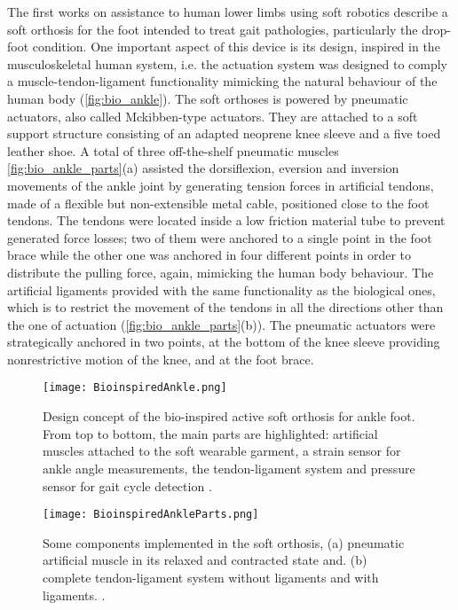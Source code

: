 The first works on assistance to human lower limbs using soft robotics \cite{park2011bio,Hamedi2015} describe a soft orthosis for the foot intended to treat gait pathologies, particularly the drop-foot condition. One important aspect of this device is its design, inspired in the musculoskeletal human system, i.e. the actuation system was designed to comply a muscle-tendon-ligament functionality mimicking the natural behaviour of the human body (\autoref{fig:bio_ankle}). The soft orthoses is powered by pneumatic actuators, also called Mckibben-type actuators. They are attached to a soft support structure consisting of an adapted neoprene knee sleeve and a five toed leather shoe. A total of three off-the-shelf pneumatic muscles \autoref{fig:bio_ankle_parts}(a) assisted the dorsiflexion, eversion and inversion movements of the ankle joint by generating tension forces in artificial tendons, made of a flexible but non-extensible metal cable, positioned close to the foot tendons. The tendons were located inside a low friction material tube to prevent generated force losses; two of them were anchored to a single point in the foot brace while the other one was anchored in four different points in order to distribute the pulling force, again, mimicking the human body behaviour. The artificial ligaments provided with the same functionality as the biological ones, which is to restrict the movement of the tendons in all the directions other than the one of actuation (\autoref{fig:bio_ankle_parts}(b)). The pneumatic actuators were strategically anchored in two points, at the bottom of the knee sleeve providing nonrestrictive motion of the knee, and at the foot brace.
\begin{figure}[hbtp!]
    \centering
    \texttt{[image: BioinspiredAnkle.png]}
    \caption{Design concept of the bio-inspired active soft orthosis for ankle foot. From top to bottom, the main parts are highlighted: artificial muscles attached to the soft wearable garment, a strain sensor for ankle angle measurements, the tendon-ligament system and pressure sensor for gait cycle detection \cite{park2011bio}. }
    \label{fig:bio_ankle}
\end{figure}
\begin{figure}[hbtp!]
    \centering
    \texttt{[image: BioinspiredAnkleParts.png]}
    \caption{Some components implemented in the soft orthosis, (a) pneumatic artificial muscle in its relaxed and contracted state and. (b) complete tendon-ligament system without ligaments and with ligaments. \cite{park2011bio}. }
    \label{fig:bio_ankle_parts}
\end{figure}

